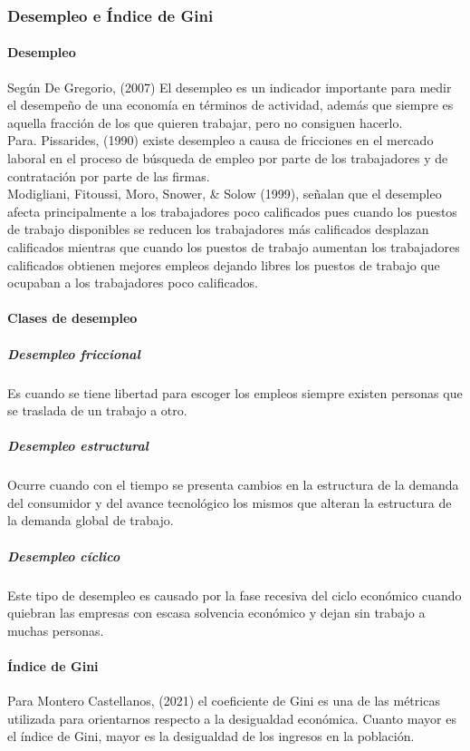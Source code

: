   \subsubsection{Desempleo e Índice de Gini}

    \paragraph{Desempleo}

Según De Gregorio, (2007) El desempleo es un indicador importante para medir el desempeño de una economía en términos de actividad, además que siempre es aquella fracción de los que quieren trabajar, pero no consiguen hacerlo. \\
Para. Pissarides, (1990) existe desempleo a causa de fricciones en el mercado laboral en el proceso de búsqueda de empleo por parte de los trabajadores y de contratación por parte de las firmas.\\
Modigliani, Fitoussi, Moro, Snower, \& Solow (1999), señalan que el desempleo afecta principalmente a los trabajadores poco calificados pues cuando los puestos de trabajo disponibles se reducen los trabajadores más calificados desplazan calificados mientras que cuando los puestos de trabajo aumentan los trabajadores calificados obtienen mejores empleos dejando libres los puestos de trabajo que ocupaban a los trabajadores poco calificados.

    \paragraph{Clases de desempleo}

  \subparagraph{Desempleo friccional}
Es cuando se tiene libertad para escoger los empleos siempre existen personas que se traslada de un trabajo a otro.

  \subparagraph{Desempleo estructural}
Ocurre cuando con el tiempo se presenta cambios en la estructura de la demanda del consumidor y del avance tecnológico los mismos que alteran la estructura de la demanda global de trabajo.

  \subparagraph{Desempleo cíclico}
Este tipo de desempleo es causado por la fase recesiva del ciclo económico cuando quiebran las empresas con escasa solvencia económico y dejan sin trabajo a muchas personas.

    \paragraph{Índice de Gini}

Para Montero Castellanos, (2021) el coeficiente de Gini es una de las métricas utilizada para orientarnos respecto a la desigualdad económica. Cuanto mayor es el índice de Gini, mayor es la desigualdad de los ingresos en la población. 